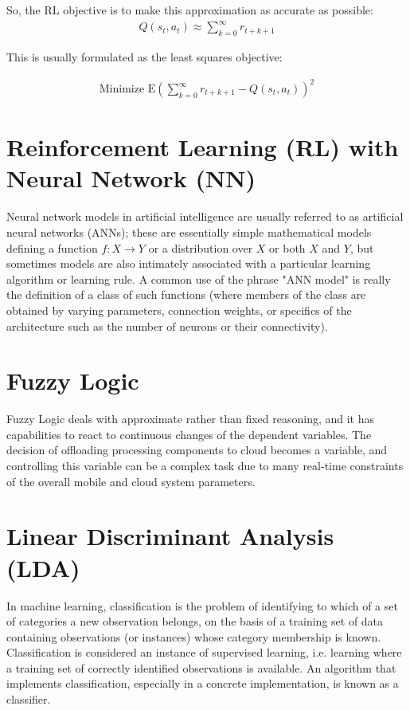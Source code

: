\documentclass[12pt]{report}
\begin{document}
So, the RL objective is to make this approximation as accurate as possible:
\begin{align*}
      Q(s_t,a_t) \approx \sum_{k=0}^\infty r_{t+k+1}
\end{align*}

This is usually formulated as the least squares objective:


    \begin{align*}
      \text{Minimize } \mathrm{E} \left ( \sum_{k=0}^\infty r_{t+k+1} - Q(s_t,a_t)\right )^2
    \end{align*}
\section{Reinforcement Learning (RL) with Neural Network (NN)}

Neural network models in artificial intelligence are usually referred to as artificial neural networks (ANNs); these are essentially simple mathematical models defining a function $\textstyle f : X \rightarrow Y $ or a distribution over $\textstyle X $ or both $\textstyle X $ and $\textstyle Y$, but sometimes models are also intimately associated with a particular learning algorithm or learning rule. A common use of the phrase "ANN model" is really the definition of a class of such functions (where members of the class are obtained by varying parameters, connection weights, or specifics of the architecture such as the number of neurons or their connectivity).
\section{Fuzzy Logic}
Fuzzy Logic deals with approximate rather than fixed reasoning, and it has capabilities to react to continuous changes of the dependent variables. The decision of offloading processing components to cloud becomes a variable, and controlling this variable can be a complex task due to many real-time constraints of the overall mobile and cloud system parameters.

\section{Linear Discriminant Analysis (LDA)}
In machine learning, classification is the problem of identifying to which of a set of categories a new observation belongs, on the basis of a training set of data containing observations (or instances) whose category membership is known. Classification is considered an instance of supervised learning, i.e. learning where a training set of correctly identified observations is available.
An algorithm that implements classification, especially in a concrete implementation, is known as a classifier. 
\end{document}
